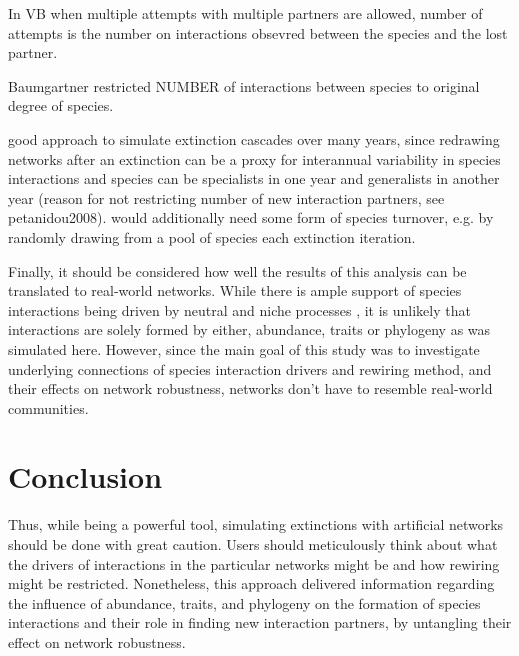 \documentclass[12pt,a4paper]{article}
\begin{document}
In VB when multiple attempts with multiple partners are allowed, number of attempts is the number on interactions obsevred between the species and the lost partner.

Baumgartner restricted NUMBER of interactions between species to original degree of species.


good approach to simulate extinction cascades over many years, since redrawing networks after an extinction can be a proxy for interannual variability in species interactions and species can be specialists in one year and generalists in another year (reason for not restricting number of new interaction partners, see petanidou2008). would additionally need some form of species turnover, e.g. by randomly drawing from a pool of species each extinction iteration.

Finally, it should be considered how well the results of this analysis can be translated to real-world networks. While there is ample support of species interactions being driven by neutral and niche processes \parencite{Jordano2003, Rezende2007, Vazquez2007, Blüthgen2008}, it is unlikely that interactions are solely formed by either, abundance, traits or phylogeny as was simulated here. However, since the main goal of this study was to investigate underlying
connections of species interaction drivers and rewiring method, and their effects on network robustness, networks don't have to resemble real-world communities.

\section{Conclusion}
Thus, while being a powerful tool, simulating extinctions with artificial networks should be done with great caution. Users should meticulously think about what the drivers of interactions in the particular networks might be and how rewiring might be restricted. Nonetheless, this approach delivered information regarding the influence of abundance, traits, and phylogeny on the formation of species interactions and their role in finding new interaction partners, by untangling their effect on network robustness.
\end{document}

